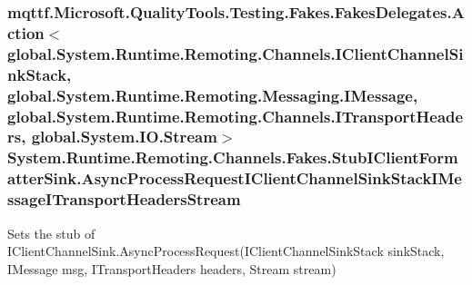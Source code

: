 \hypertarget{class_system_1_1_runtime_1_1_remoting_1_1_channels_1_1_fakes_1_1_stub_i_client_formatter_sink_a641fc52e0a9078c857d8ec050328423d}{
\subsubsection[{Async\-Process\-Request\-I\-Client\-Channel\-Sink\-Stack\-I\-Message\-I\-Transport\-Headers\-Stream}]{\setlength{\rightskip}{0pt plus 5cm}mqttf.\-Microsoft.\-Quality\-Tools.\-Testing.\-Fakes.\-Fakes\-Delegates.\-Action$<$global.\-System.\-Runtime.\-Remoting.\-Channels.\-I\-Client\-Channel\-Sink\-Stack, global.\-System.\-Runtime.\-Remoting.\-Messaging.\-I\-Message, global.\-System.\-Runtime.\-Remoting.\-Channels.\-I\-Transport\-Headers, global.\-System.\-I\-O.\-Stream$>$ System.\-Runtime.\-Remoting.\-Channels.\-Fakes.\-Stub\-I\-Client\-Formatter\-Sink.\-Async\-Process\-Request\-I\-Client\-Channel\-Sink\-Stack\-I\-Message\-I\-Transport\-Headers\-Stream}}\label{class_system_1_1_runtime_1_1_remoting_1_1_channels_1_1_fakes_1_1_stub_i_client_formatter_sink_a641fc52e0a9078c857d8ec050328423d}


Sets the stub of I\-Client\-Channel\-Sink.\-Async\-Process\-Request(\-I\-Client\-Channel\-Sink\-Stack sink\-Stack, I\-Message msg, I\-Transport\-Headers headers, Stream stream)

